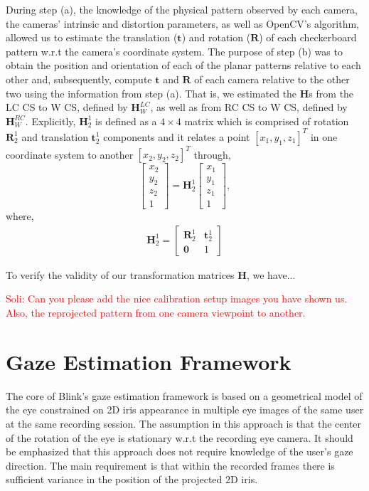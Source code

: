 \documentclass{article}
\begin{document}
During step (a), the knowledge of the physical pattern observed by each camera, the cameras' intrinsic and distortion parameters, as well as OpenCV's algorithm, allowed us to estimate the translation ($\mathbf{t}$) and rotation ($\mathbf{R}$) of each checkerboard pattern w.r.t the camera's coordinate system. The purpose of step (b) was to obtain the position and orientation of each of the planar patterns relative to each other and, subsequently, compute $\mathbf{t}$ and $\mathbf{R}$ of each camera relative to the other two using the information from step (a).  That is, we estimated the $\mathbf{H}$s from the LC CS to W CS, defined by $\mathbf{H}^{LC}_{W}$, as well as from RC CS to W CS, defined by $\mathbf{H}^{RC}_{W}$.  Explicitly, $\mathbf{H}^1_2$ is defined as a $4 \times 4$ matrix which is comprised of rotation $\textbf{R}^1_2$ and translation $\textbf{t}^1_2$ components and it relates a point $[x_1, y_1, z_1]^T$ in one coordinate system to another $[x_2, y_2, z_2]^T$ through,
\begin{equation}
    \begin{bmatrix}
    x_2 \\
    y_2 \\
    z_2 \\
    1
  \end{bmatrix} = \mathbf{H}^1_2  \begin{bmatrix}
    x_1 \\
    y_1 \\
    z_1 \\
    1
  \end{bmatrix},
\end{equation}
where,
\begin{align*}
    \mathbf{H}^1_2 = \begin{bmatrix}
    \textbf{R}^1_2 & \textbf{t}^1_2\\
    \textbf{0} & 1
  \end{bmatrix} 
\end{align*}

To verify the validity of our transformation matrices \textbf{H}, we have...

\textcolor{red}{Soli: Can you please add the nice calibration setup images you have shown us. Also, the reprojected pattern from one camera viewpoint to another.}

\section{Gaze Estimation Framework}
The core of Blink's gaze estimation framework is based on a geometrical model of the eye constrained on 2D iris appearance in multiple eye images of the same user at the same recording session. The assumption in this approach is that the center of the rotation of the eye is stationary w.r.t the recording eye camera.  It should be emphasized that this approach does not require knowledge of the user's gaze direction.  The main requirement is that within the recorded frames there is sufficient variance in the position of the projected 2D iris.
\end{document}
